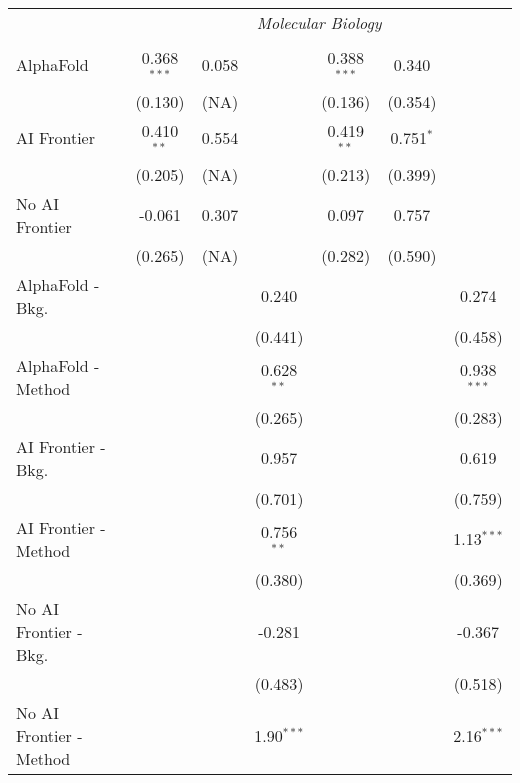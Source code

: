\begin{tabular}{lcccccc}
 & \multicolumn{6}{c}{\textit{Molecular Biology}} \\ \\
   AlphaFold               & 0.368$^{***}$ & 0.058 &              & 0.388$^{***}$ & 0.340       &   \\   
                           & (0.130)       & (NA)  &              & (0.136)       & (0.354)     &   \\   
   AI Frontier             & 0.410$^{**}$  & 0.554 &              & 0.419$^{**}$  & 0.751$^{*}$ &   \\   
                           & (0.205)       & (NA)  &              & (0.213)       & (0.399)     &   \\   
   No AI Frontier          & -0.061        & 0.307 &              & 0.097         & 0.757       &   \\   
                           & (0.265)       & (NA)  &              & (0.282)       & (0.590)     &   \\   
   AlphaFold - Bkg.        &               &       & 0.240        &               &             & 0.274\\   
                           &               &       & (0.441)      &               &             & (0.458)\\   
   AlphaFold - Method      &               &       & 0.628$^{**}$ &               &             & 0.938$^{***}$\\   
                           &               &       & (0.265)      &               &             & (0.283)\\   
   AI Frontier - Bkg.      &               &       & 0.957        &               &             & 0.619\\   
                           &               &       & (0.701)      &               &             & (0.759)\\   
   AI Frontier - Method    &               &       & 0.756$^{**}$ &               &             & 1.13$^{***}$\\   
                           &               &       & (0.380)      &               &             & (0.369)\\   
   No AI Frontier - Bkg.   &               &       & -0.281       &               &             & -0.367\\   
                           &               &       & (0.483)      &               &             & (0.518)\\   
   No AI Frontier - Method &               &       & 1.90$^{***}$ &               &             & 2.16$^{***}$\\   

\end{tabular}
